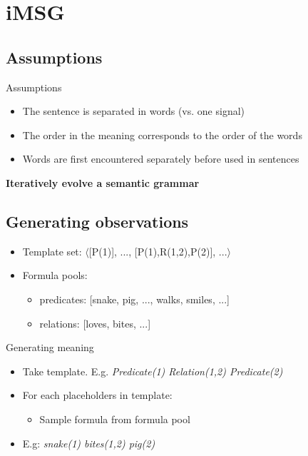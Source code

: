 \documentclass[11pt,a4paper,xcolor=dvipsnames]{beamer}
\begin{document}
\section{iMSG}
\subsection{Assumptions}
\begin{frame}{Assumptions}
\begin{itemize}
  \item The sentence is separated in words (vs. one signal)
  \item The order in the meaning corresponds to the order of the words
  \item Words are first encountered separately before used in sentences
\end{itemize}
\end{frame}

\begin{frame}
  \begin{center}
  {\Huge \textbf{Iteratively evolve a semantic grammar}}
  \end{center}
\end{frame}

\subsection{Generating observations}%

\begin{frame}
\begin{itemize}
  \item Template set: $\langle$[P(1)], ..., [P(1),R(1,2),P(2)], ...$\rangle$
  \item Formula pools:
  \begin{itemize}
    \item predicates: [snake, pig, ..., walks, smiles, ...] %
    \item relations: [loves, bites, ...] %
  \end{itemize}
\end{itemize}
\end{frame}

\begin{frame}{Generating meaning}
\begin{itemize}
  \item Take template. E.g. \textit{ Predicate(1) Relation(1,2) Predicate(2) }
  \item For each placeholders in template:
  \begin{itemize}
    \item Sample formula from formula pool
  \end{itemize}
  \item E.g: \textit{ snake(1) bites(1,2) pig(2) }
\end{itemize}
\end{frame}
\end{document}

